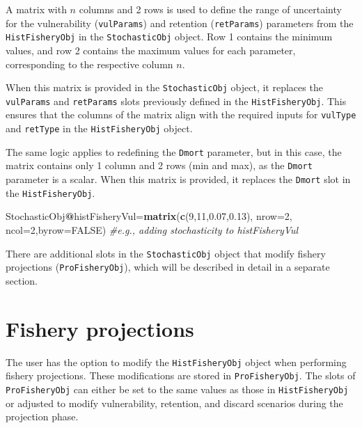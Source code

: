 \documentclass[
]{book}
\newenvironment{Shaded}{\begin{snugshade}}{\end{snugshade}}
\newcommand{\AttributeTok}[1]{\textcolor[rgb]{0.13,0.29,0.53}{#1}}
\newcommand{\CommentTok}[1]{\textcolor[rgb]{0.56,0.35,0.01}{\textit{#1}}}
\newcommand{\ConstantTok}[1]{\textcolor[rgb]{0.56,0.35,0.01}{#1}}
\newcommand{\DecValTok}[1]{\textcolor[rgb]{0.00,0.00,0.81}{#1}}
\newcommand{\FloatTok}[1]{\textcolor[rgb]{0.00,0.00,0.81}{#1}}
\newcommand{\FunctionTok}[1]{\textcolor[rgb]{0.13,0.29,0.53}{\textbf{#1}}}
\newcommand{\NormalTok}[1]{#1}
\newcommand{\OtherTok}[1]{\textcolor[rgb]{0.56,0.35,0.01}{#1}}
\newcommand{\SpecialCharTok}[1]{\textcolor[rgb]{0.81,0.36,0.00}{\textbf{#1}}}
\begin{document}
A matrix with \(n\) columns and 2 rows is used to define the range of uncertainty for the vulnerability (\texttt{vulParams}) and retention (\texttt{retParams}) parameters from the \texttt{HistFisheryObj} in the \texttt{StochasticObj} object. Row 1 contains the minimum values, and row 2 contains the maximum values for each parameter, corresponding to the respective column \(n\).

When this matrix is provided in the \texttt{StochasticObj} object, it replaces the \texttt{vulParams} and \texttt{retParams} slots previously defined in the \texttt{HistFisheryObj}. This ensures that the columns of the matrix align with the required inputs for \texttt{vulType} and \texttt{retType} in the \texttt{HistFisheryObj} object.

The same logic applies to redefining the \texttt{Dmort} parameter, but in this case, the matrix contains only 1 column and 2 rows (min and max), as the \texttt{Dmort} parameter is a scalar. When this matrix is provided, it replaces the \texttt{Dmort} slot in the \texttt{HistFisheryObj}.

\begin{Shaded}
\begin{Highlighting}[]
\NormalTok{StochasticObj}\SpecialCharTok{@}\NormalTok{histFisheryVul}\OtherTok{=}\FunctionTok{matrix}\NormalTok{(}\FunctionTok{c}\NormalTok{(}\DecValTok{9}\NormalTok{,}\DecValTok{11}\NormalTok{,}\FloatTok{0.07}\NormalTok{,}\FloatTok{0.13}\NormalTok{), }\AttributeTok{nrow=}\DecValTok{2}\NormalTok{, }\AttributeTok{ncol=}\DecValTok{2}\NormalTok{,}\AttributeTok{byrow=}\ConstantTok{FALSE}\NormalTok{)  }\CommentTok{\#e.g., adding stochasticity to histFisheryVul}
\end{Highlighting}
\end{Shaded}

There are additional slots in the \texttt{StochasticObj} object that modify fishery projections (\texttt{ProFisheryObj}), which will be described in detail in a separate section.

\section{Fishery projections}\label{fishery-projections}

The user has the option to modify the \texttt{HistFisheryObj} object when performing fishery projections. These modifications are stored in \texttt{ProFisheryObj}. The slots of \texttt{ProFisheryObj} can either be set to the same values as those in \texttt{HistFisheryObj} or adjusted to modify vulnerability, retention, and discard scenarios during the projection phase.
\end{document}
